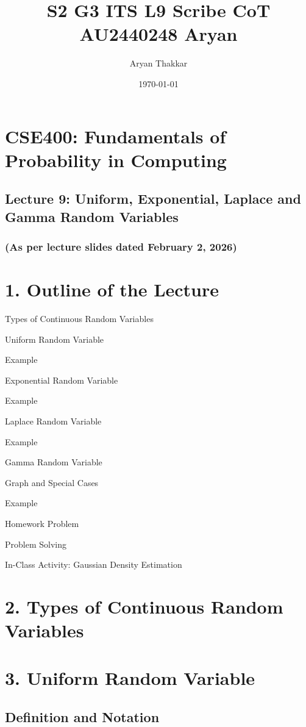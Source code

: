 \documentclass[12pt]{article}
\title{S2 G3 ITS L9 Scribe CoT AU2440248 Aryan}
\author{Aryan Thakkar}
\date{\today}
\begin{document}
\maketitle
\section*{CSE400: Fundamentals of Probability in Computing}
\subsection*{Lecture 9: Uniform, Exponential, Laplace and Gamma Random Variables}
\subsubsection*{(As per lecture slides dated February 2, 2026)}

\section*{1. Outline of the Lecture}

Types of Continuous Random Variables

Uniform Random Variable

Example

Exponential Random Variable

Example

Laplace Random Variable

Example

Gamma Random Variable

Graph and Special Cases

Example

Homework Problem

Problem Solving

In-Class Activity: Gaussian Density Estimation

\section*{2. Types of Continuous Random Variables}

\section*{3. Uniform Random Variable}

\subsection*{Definition and Notation}
\end{document}
